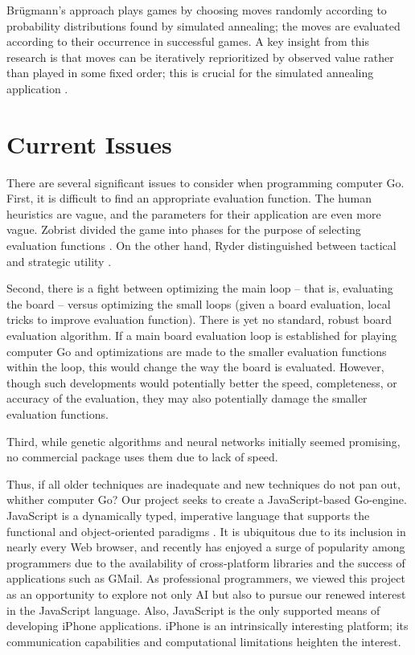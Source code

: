 \documentclass{memoir}
\begin{document}
Br\"ugmann's approach plays games by choosing moves randomly according to probability distributions found by simulated annealing; the moves are evaluated according to their occurrence in successful games. A key insight from this research is that moves can be iteratively reprioritized by observed value rather than played in some fixed order; this is crucial for the simulated annealing application \cite{Bruegmann93}.

\chapter{Current Issues}

There are several significant issues to consider when programming computer Go. First, it is difficult to find an appropriate evaluation function. The human heuristics are vague, and the parameters for their application  are even more vague. Zobrist divided the game into phases for the purpose of selecting evaluation functions \cite{Zobrist1970b}. On the other hand, Ryder distinguished between tactical and strategic utility \cite{Burmeister}.

Second, there is a fight between optimizing the main loop -- that is, evaluating the board -- versus optimizing the small loops (given a board evaluation, local tricks to improve evaluation function). There is yet no standard, robust board evaluation algorithm. If a main board evaluation loop is established for playing computer Go and optimizations are made to the smaller evaluation functions within the loop, this would change the way the board is evaluated.  However, though such developments would potentially better the speed, completeness, or accuracy of the evaluation, they may also potentially damage the smaller evaluation functions.

Third, while genetic algorithms and neural networks initially seemed promising, no commercial package uses them due to lack of speed.

Thus, if all older techniques are inadequate and new techniques do not pan out, whither computer Go? Our project seeks to create a JavaScript-based Go-engine. JavaScript is a dynamically typed, imperative language that supports the functional and object-oriented paradigms \cite{ECMA-262}. It is ubiquitous due to its inclusion in nearly every Web browser, and recently has enjoyed a surge of popularity among programmers due to the availability of cross-platform libraries and the success of applications such as GMail. As professional programmers, we viewed this project as an opportunity to explore not only AI but also to pursue our renewed interest in the JavaScript language. Also, JavaScript is the only supported means of developing iPhone applications. iPhone is an intrinsically interesting platform; its communication capabilities and computational limitations heighten the interest.
\end{document}
